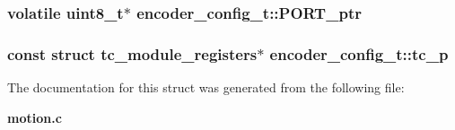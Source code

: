 \subsubsection[{P\+O\+R\+T\+\_\+ptr}]{\setlength{\rightskip}{0pt plus 5cm}volatile uint8\+\_\+t$\ast$ encoder\+\_\+config\+\_\+t\+::\+P\+O\+R\+T\+\_\+ptr}\label{structencoder__config__t_a9cb2f16ba9ae962a2f4f401f4e53ae72}
\subsubsection[{tc\+\_\+p}]{\setlength{\rightskip}{0pt plus 5cm}const struct {\bf tc\+\_\+module\+\_\+registers}$\ast$ encoder\+\_\+config\+\_\+t\+::tc\+\_\+p}\label{structencoder__config__t_a63ef61b522de661084aca5407037622d}


The documentation for this struct was generated from the following file\+:\begin{DoxyCompactItemize}
\item 
{\bf motion.\+c}\end{DoxyCompactItemize}
